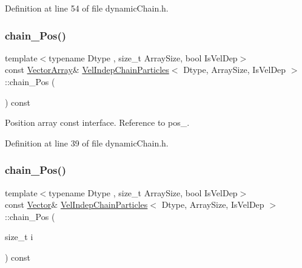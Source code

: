 Definition at line 54 of file dynamic\+Chain.\+h.

\mbox{\label{class_vel_indep_chain_particles_a77765235a45fd13ce74d69d1a1db1770}} 
\subsubsection{\texorpdfstring{chain_\+Pos()}{chainPos()}\hspace{0.1cm}{\footnotesize\ttfamily [1/2]}}
{\footnotesize\ttfamily template$<$typename Dtype , size\+\_\+t Array\+Size, bool Is\+Vel\+Dep$>$ \\
const \mbox{\hyperlink{class_vel_indep_particles_a27580f65b6523bfb6900520af2e44708}{Vector\+Array}}\& \mbox{\hyperlink{class_vel_indep_chain_particles}{Vel\+Indep\+Chain\+Particles}}$<$ Dtype, Array\+Size, Is\+Vel\+Dep $>$\+::chain_\+Pos (\begin{DoxyParamCaption}{ }\end{DoxyParamCaption}) const\hspace{0.3cm}{\ttfamily [inline]}}



Position array const interface. Reference to pos\+\_\+. 



Definition at line 39 of file dynamic\+Chain.\+h.

\mbox{\label{class_vel_indep_chain_particles_a245e69b858810e26e5ed61746694382e}} 
\subsubsection{\texorpdfstring{chain_\+Pos()}{chainPos()}\hspace{0.1cm}{\footnotesize\ttfamily [2/2]}}
{\footnotesize\ttfamily template$<$typename Dtype , size\+\_\+t Array\+Size, bool Is\+Vel\+Dep$>$ \\
const \mbox{\hyperlink{class_vel_indep_particles_aa7e03da81f44941c06abf43ec2180079}{Vector}}\& \mbox{\hyperlink{class_vel_indep_chain_particles}{Vel\+Indep\+Chain\+Particles}}$<$ Dtype, Array\+Size, Is\+Vel\+Dep $>$\+::chain_\+Pos (\begin{DoxyParamCaption}\item[{size\+\_\+t}]{i }\end{DoxyParamCaption}) const\hspace{0.3cm}{\ttfamily [inline]}}



